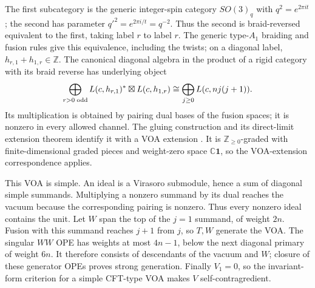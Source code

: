 \documentclass[11pt]{article}
\newcommand{\C}{\mathbb C}\newcommand{\Q}{\mathbb Q}\newcommand{\Z}{\mathbb Z}
\newcommand{\one}{\mathbf1}\newcommand{\D}{\mathcal D}\newcommand{\Dcat}{\mathcal D}
\numberwithin{equation}{section}
\begin{document}
The first subcategory is the generic integer-spin category $SO(3)_q$ with $q^2=e^{2\pi it}$; the second has parameter $q'^2=e^{2\pi i/t}=q^{-2}$. Thus the second is braid-reversed equivalent to the first, taking label $r$ to label $r$. The generic type-$A_1$ braiding and fusion rules give this equivalence, including the twists; on a diagonal label, $h_{r,1}+h_{1,r}\in\Z$. The canonical diagonal algebra in the product of a rigid category with its braid reverse has underlying object
\[
\bigoplus_{r>0\;\mathrm{odd}}L(c,h_{r,1})^*\boxtimes L(c,h_{1,r})
\cong\bigoplus_{j\geq0}L(c,nj(j+1)).
\]
Its multiplication is obtained by pairing dual bases of the fusion spaces; it is nonzero in every allowed channel. The gluing construction and its direct-limit extension theorem identify it with a VOA extension \cite{A:CKM,A:Ind}. It is $\Z_{\geq0}$-graded with finite-dimensional graded pieces and weight-zero space $\C\one$, so the VOA-extension correspondence applies.

This VOA is simple. An ideal is a Virasoro submodule, hence a sum of diagonal simple summands. Multiplying a nonzero summand by its dual reaches the vacuum because the corresponding pairing is nonzero. Thus every nonzero ideal contains the unit. Let $W$ span the top of the $j=1$ summand, of weight $2n$. Fusion with this summand reaches $j+1$ from $j$, so $T,W$ generate the VOA. The singular $WW$ OPE has weights at most $4n-1$, below the next diagonal primary of weight $6n$. It therefore consists of descendants of the vacuum and $W$; closure of these generator OPEs proves strong generation. Finally $V_1=0$, so the invariant-form criterion for a simple CFT-type VOA \cite{A:Li} makes $V$ self-contragredient.
\end{document}
